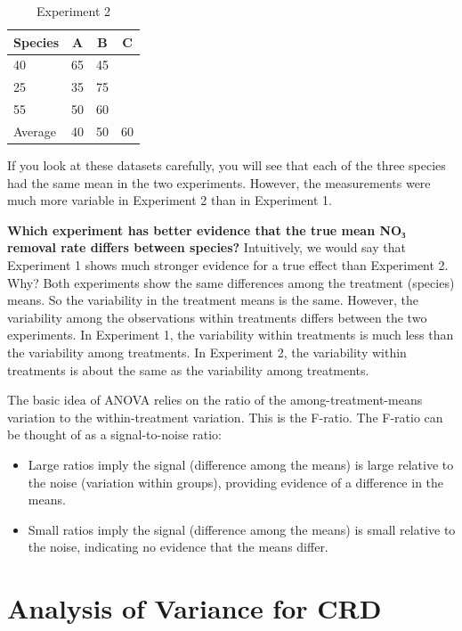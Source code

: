 \documentclass[
  letterpaper,
  DIV=11,
  numbers=noendperiod,
  oneside]{scrreprt}
\begin{document}
\begin{table}[h]
    \centering
    \begin{tabular}{lccc}
        \toprule
        Species & A & B & C \\
        \midrule
        40 & 65 & 45 \\
        25 & 35 & 75 \\
        55 & 50 & 60 \\
        \midrule
        Average & 40 & 50 & 60 \\
        \bottomrule
    \end{tabular}
    \caption{Experiment 2}
\end{table}

If you look at these datasets carefully, you will see that each of the
three species had the same mean in the two experiments. However, the
measurements were much more variable in Experiment 2 than in Experiment
1.

\textbf{Which experiment has better evidence that the true mean NO₃
removal rate differs between species?} Intuitively, we would say that
Experiment 1 shows much stronger evidence for a true effect than
Experiment 2. Why? Both experiments show the same differences among the
treatment (species) means. So the variability in the treatment means is
the same. However, the variability among the observations within
treatments differs between the two experiments. In Experiment 1, the
variability within treatments is much less than the variability among
treatments. In Experiment 2, the variability within treatments is about
the same as the variability among treatments.

The basic idea of ANOVA relies on the ratio of the among-treatment-means
variation to the within-treatment variation. This is the F-ratio. The
F-ratio can be thought of as a signal-to-noise ratio:

\begin{itemize}
\item
  Large ratios imply the signal (difference among the means) is large
  relative to the noise (variation within groups), providing evidence of
  a difference in the means.
\item
  Small ratios imply the signal (difference among the means) is small
  relative to the noise, indicating no evidence that the means differ.
\end{itemize}

\section{Analysis of Variance for
CRD}\label{analysis-of-variance-for-crd}
\end{document}
